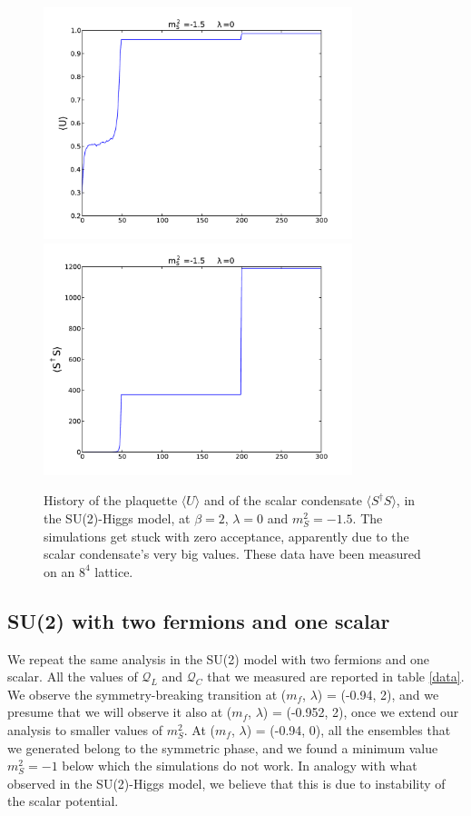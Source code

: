 \begin{figure}[thb] 
\begin{adjustwidth}{-4em}{-4em}
  \includegraphics[width=9cm,clip]{pics/history_plaquette}\includegraphics[width=9cm,clip]{pics/history_condensate}
\end{adjustwidth}
  \caption{History of the plaquette $\langle U \rangle$ and of the scalar condensate $\langle S^{\dagger}S \rangle$, in the SU(2)-Higgs model, at $\beta = 2$, $\lambda = 0$ and $m_S^2 = -1.5$. The simulations get stuck with zero acceptance, apparently due to the scalar condensate's very big values. These data have been measured on an $8^4$ lattice.}
  \label{SU2H_history}
\end{figure}


\subsection{SU(2) with two fermions and one scalar}

We repeat the same analysis in the SU(2) model with two fermions and one scalar. All the values of $\mathcal Q_L$ and $\mathcal Q_C$ that we measured are reported in table \ref{data}. We observe the symmetry-breaking transition at ($m_f$, $\lambda$) = (-0.94, 2), and we presume that we will observe it also at ($m_f$, $\lambda$) = (-0.952, 2), once we extend our analysis to smaller values of $m_S^2$. At ($m_f$, $\lambda$) = (-0.94, 0), all the ensembles that we generated belong to the symmetric phase, and we found a minimum value $m_S^2 = -1$ below which the simulations do not work. In analogy with what observed in the SU(2)-Higgs model, we believe that this is due to instability of the scalar potential.

